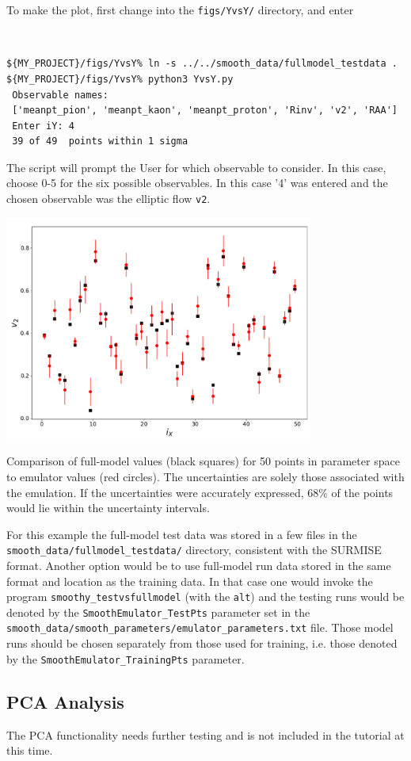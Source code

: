 \documentclass[UserManual.tex]{subfiles}
\begin{document}
To make the plot, first change into the {\tt figs/YvsY/} directory, and enter
{\tt
\begin{verbatim}
${MY_PROJECT}/figs/YvsY% ln -s ../../smooth_data/fullmodel_testdata .
${MY_PROJECT}/figs/YvsY% python3 YvsY.py
 Observable names:
 ['meanpt_pion', 'meanpt_kaon', 'meanpt_proton', 'Rinv', 'v2', 'RAA']
 Enter iY: 4
 39 of 49  points within 1 sigma
\end{verbatim}}
The script will prompt the User for which observable to consider. In this case, choose 0-5 for the six possible observables. In this case '4' was entered and the chosen observable was the elliptic flow {\tt v2}. 
\parbox{4.5in}{\centerline{\includegraphics[width=4.0in]{figs/YvsY_rhic.pdf}}}
\parbox{2.25in}{Comparison of full-model values (black squares) for 50 points in parameter space to emulator values (red circles). The uncertainties are solely those associated with the emulation. If the uncertainties were accurately expressed, 68\% of the points would lie within the uncertainty intervals.}

For this example the full-model test data was stored in a few files in the {\tt smooth\_data/fullmodel\_testdata/} directory, consistent with the SURMISE format. Another option would be to use full-model run data stored in the same format and location as the training data. In that case one would invoke the program {\tt smoothy\_testvsfullmodel} (with the {\tt alt}) and the testing runs would be denoted by the {\tt SmoothEmulator\_TestPts} parameter set in the {\tt smooth\_data/smooth\_parameters/emulator\_parameters.txt} file. Those model runs should be chosen separately from those used for training, i.e. those denoted by the {\tt SmoothEmulator\_TrainingPts} parameter.

\subsection{PCA Analysis}
The PCA functionality needs further testing and is not included in the tutorial at this time.
\end{document}
